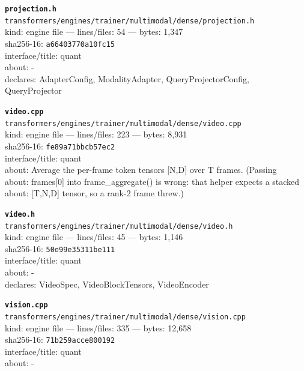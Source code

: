 \noindent\textbf{\texttt{projection.h}}\\
\texttt{transformers/engines/trainer/multimodal/dense/projection.h}\\
kind: engine file --- lines/files: 54 --- bytes: 1,347\\
sha256-16: \texttt{a66403770a10fc15}\\
interface/title: quant\\
about: -\\
declares: AdapterConfig, ModalityAdapter, QueryProjectorConfig, QueryProjector\\
\vspace*{6.0pt}
\newpage

\noindent\textbf{\texttt{video.cpp}}\\
\texttt{transformers/engines/trainer/multimodal/dense/video.cpp}\\
kind: engine file --- lines/files: 223 --- bytes: 8,931\\
sha256-16: \texttt{fe89a71bbcb57ec2}\\
interface/title: quant\\
about: Average the per-frame token tensors [N,D] over T frames. (Passing\\
about: frames[0] into frame\_aggregate() is wrong: that helper expects a stacked\\
about: [T,N,D] tensor, so a rank-2 frame threw.)\\
\vspace*{6.0pt}

\noindent\textbf{\texttt{video.h}}\\
\texttt{transformers/engines/trainer/multimodal/dense/video.h}\\
kind: engine file --- lines/files: 45 --- bytes: 1,146\\
sha256-16: \texttt{50e99e35311be111}\\
interface/title: quant\\
about: -\\
declares: VideoSpec, VideoBlockTensors, VideoEncoder\\
\vspace*{6.0pt}

\noindent\textbf{\texttt{vision.cpp}}\\
\texttt{transformers/engines/trainer/multimodal/dense/vision.cpp}\\
kind: engine file --- lines/files: 335 --- bytes: 12,658\\
sha256-16: \texttt{71b259acce800192}\\
interface/title: quant\\
about: -\\
\vspace*{6.0pt}

